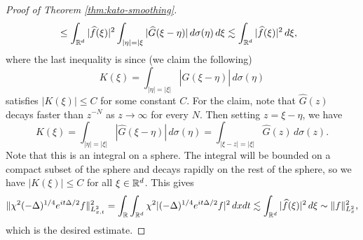 \begin{proof}[Proof of Theorem \ref{thm:kato-smoothing}]
\begin{align*}
    &\le \int_{\mathbb{R}^d} |\widehat{f}(\xi)|^2
    \int_{|\eta| = |\xi} |\widehat{G}(\xi - \eta)|\, d\sigma(\eta) \, d\xi
    \lesssim \int_{\mathbb{R}^d} |\widehat{f}(\xi)|^2 \, d\xi,
  \end{align*}
  where the last inequality is since (we claim the
  following)
  \[
    K(\xi) = \int_{|\eta| = |\xi|} |\widehat{G}(\xi - \eta)|\, d\sigma(\eta)
  \]
  satisfies $|K(\xi)| \le C$ for some constant $C$.
  For the claim, note that $\widehat{G}(z)$
  decays faster than $z^{-N}$ as $z \to \infty$ for
  every $N$. Then setting $z = \xi - \eta$, we have
  \[
    K(\xi) = \int_{|\eta| = |\xi|} |\widehat{G}(\xi - \eta)|\, d\sigma(\eta)
    = \int_{|\xi - z| = |\xi|} \widehat{G}(z)\, d\sigma(z).
  \]
  Note that this is an integral on a sphere. The
  integral will be bounded on a compact subset of the
  sphere and decays rapidly on the rest of the sphere,
  so we have $|K(\xi)| \le C$ for all $\xi \in \mathbb{R}^d$.
  This gives
  \[
    \|\chi^2 (-\Delta)^{1 / 4} e^{it \Delta / 2} f\|_{L^2_{x, t}}^2
    = 
    \int_{\mathbb{R}} \int_{\mathbb{R}^d} \chi^2 |(-\Delta)^{1 / 4} e^{it \Delta / 2} f|^2\, dx dt
    \lesssim \int_{\mathbb{R}^d} |\widehat{f}(\xi)|^2 \, d\xi
    \sim \|f\|_{L^2_x}^2,
  \]
  which is the desired estimate.
\end{proof}

